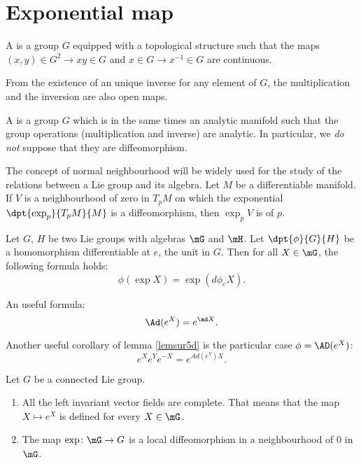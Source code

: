 \section{Exponential map}

A  is a group $G$ equipped with a topological structure such that the maps $(x,y)\in G^2\to xy\in G$ and $x\in G\to x^{-1}\in G$ are continuous.

\begin{remark}\label{rem:ouvert}
From the existence of an unique inverse for any element of $G$, the multiplication and the inversion are also open maps.
\end{remark}

A  is a group $G$ which is in the same times an analytic manifold such that the group operations (multiplication and inverse) are analytic. In particular, we \emph{do not} suppose that they are diffeomorphism.

The concept of normal neighbourhood will be widely used for the study of the relations between a Lie group and its algebra. Let $M$ be a differentiable manifold. If $V$ is a neighbourhood of zero in $T_pM$ on which the exponential $\dpt{\exp_p}{T_pM}{M}$ is a diffeomorphism, then $\exp_pV$ is   of $p$.

\begin{lemma}		\label{lemsur5d}
	Let $G$, $H$ be two Lie groups with algebras $\mG$ and $\mH$. Let $\dpt{\phi}{G}{H}$ be a homomorphism differentiable at $e$, the unit in $G$. Then for all $X\in\mG$, the following formula holds:
	\[
		\phi(\exp X)=\exp(d\phi_eX).
	\]
\end{lemma}

\begin{corollary}\label{Ad_e}
An useful formula:
\[
   \Ad(e^X)=e^{\ad X}.
\]
\end{corollary}

\begin{corollary}
Another useful corollary of lemma \ref{lemsur5d} is the particular case $\phi=\AD(e^X)$:
\[
   e^Xe^Ye^{-X}=e^{Ad(e^Y)X}.
\]
\label{cor:eXeYe-X}
\end{corollary}

\begin{proposition}
	Let $G$ be a connected Lie group.
	\begin{enumerate}

		\item
			All the left invariant vector fields are complete. That means that the map $X\mapsto  e^{X}$ is defined for every $X\in \mG$.
		\item
			The map $\exp\colon \mG\to G$ is a local diffeomorphism in a neighbourhood of $0$ in $\mG$.
	\end{enumerate}
\end{proposition}

